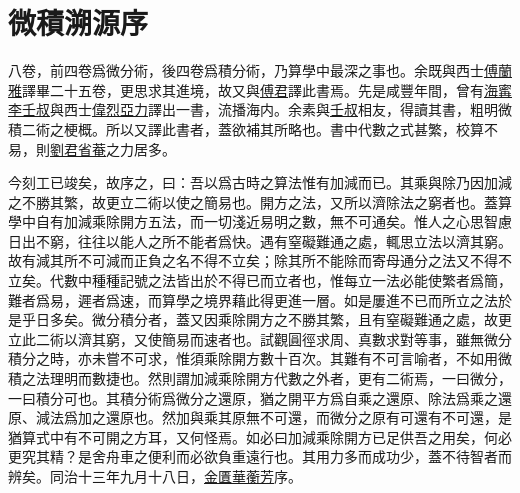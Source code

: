 \chapter {微積溯源序}
\gdef\firstsectiontitle{微積溯源序}
\thispagestyle{fancy}

  八卷，前四卷爲微分術，後四卷爲積分術，乃算學中最深之事也。余既與西士\uline{傅蘭雅}譯畢二十五卷，更思求其進境，故又與\uline{傅君}譯此書焉。先是咸豐年間，曾有\uline{海寗}\uline{李壬叔}與西士\uline{偉烈亞力}譯出一書，流播海内。余素與\uline{壬叔}相友，得讀其書，粗明微積二術之梗概。所以又譯此書者，蓋欲補其所略也。書中代數之式甚繁，校算不易，則\uline{劉君省菴}之力居多。

  今刻工已竣矣，故序之，曰：吾以爲古時之算法惟有加減而已。其乘與除乃因加減之不勝其繁，故更立二術以使之簡易也。開方之法，又所以濟除法之窮者也。蓋算學中自有加減乘除開方五法，而一切淺近易明之數，無不可通矣。惟人之心思智慮日出不窮，往往以能人之所不能者爲快。遇有窒礙難通之處，輒思立法以濟其窮。故有減其所不可減而正負之名不得不立矣；除其所不能除而寄母通分之法又不得不立矣。代數中種種記號之法皆出於不得已而立者也，惟每立一法必能使繁者爲簡，難者爲易，遲者爲速，而算學之境界藉此得更進一層。如是屢進不已而所立之法於是乎日多矣。微分積分者，蓋又因乘除開方之不勝其繁，且有窒礙難通之處，故更立此二術以濟其窮，又使簡易而速者也。試觀圓徑求周、真數求對等事，雖無微分積分之時，亦未嘗不可求，惟須乘除開方數十百次。其難有不可言喻者，不如用微積之法理明而數捷也。然則謂加減乘除開方代數之外者，更有二術焉，一曰微分，一曰積分可也。其積分術爲微分之還原，猶之開平方爲自乘之還原、除法爲乘之還原、減法爲加之還原也。然加與乘其原無不可還，而微分之原有可還有不可還，是猶算式中有不可開之方耳，又何怪焉。如必曰加減乘除開方已足供吾之用矣，何必更究其精？是舍舟車之便利而必欲負重遠行也。其用力多而成功少，蓋不待智者而辨矣。同治十三年九月十八日，\uline{金匱}\uline{華蘅芳}序。